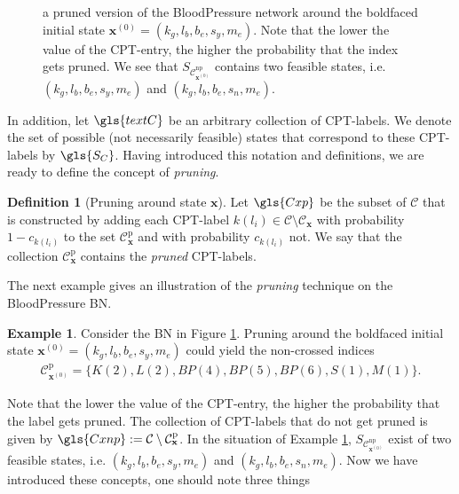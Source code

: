 \documentclass[a4paper, twoside, 11pt]{report}
\newcommand{\bfx}{{\mathbf{x}}}
\newcommand{\C}{{\mathcal C}}
\theoremstyle{plain}
\theoremstyle{definition}
\newtheorem{definition}[thm]{Definition}
\newtheorem{example}[thm]{Example}
\theoremstyle{remark}
\begin{document}
\begin{figure}[t!]
\begin{adjustbox}{width=\textwidth}
\end{adjustbox}
\caption{a pruned version of the BloodPressure network around the boldfaced initial state $\bfx^{(0)} = (k_g, l_b, b_e, s_y, m_e)$. Note that the lower the value of the CPT-entry, the higher the probability that the index gets pruned. We see that $S_{\C_{\bfx^{(0)}}^{\text{np}}}$ contains two feasible states, i.e. $(k_g, l_b, b_e, s_y, m_e)$ and $(k_g, l_b, b_e, s_n, m_e)$.}
\label{pruning}
\end{figure}
In addition, let $\gls{textC}$ be an arbitrary collection of CPT-labels. We denote the set of possible (not necessarily feasible) states that correspond to these CPT-labels by $\gls{S_C}$. Having introduced this notation and definitions, we are ready to define the concept of \textit{pruning}.
\begin{definition}[Pruning around state $\bfx$]\label{prunedef}
Let $\gls{Cxp}$ be the subset of $\C$ that is constructed by adding each CPT-label $k(l_i) \in \C \setminus \C_{\bfx}$ with probability $1-c_{k(l_i)}$ to the set $\C_\bfx^{\text{p}}$ and with probability $c_{k(l_i)}$ not. We say that the collection $\C_\bfx^{\text{p}}$ contains the \textit{pruned} CPT-labels. 
\end{definition}
The next example gives an illustration of the \textit{pruning} technique on the BloodPressure BN.
\begin{example}\label{ex:pruning}
Consider the BN in Figure \ref{pruning}. Pruning around the boldfaced initial state $\bfx^{(0)} = (k_g, l_b, b_e, s_y, m_e)$ could yield the non-crossed indices 
\begin{align*}
\C_{\bfx^{(0)}}^{\text{p}} = \{ K(2), L(2), BP(4), BP(5), BP(6), S(1), M(1) \}.
\end{align*}
\end{example}
Note that the lower the value of the CPT-entry, the higher the probability that the label gets pruned. The collection of CPT-labels that do not get pruned is given by $\gls{Cxnp}:=\C \setminus \C_\bfx^{\text{p}}$. In the situation of Example \ref{ex:pruning}, $S_{\C_{\bfx^{(0)}}^{\text{np}}}$ exist of two feasible states, i.e. $(k_g, l_b, b_e, s_y, m_e)$ and $(k_g, l_b, b_e, s_n, m_e)$. Now we have introduced these concepts, one should note three things
\end{document}
